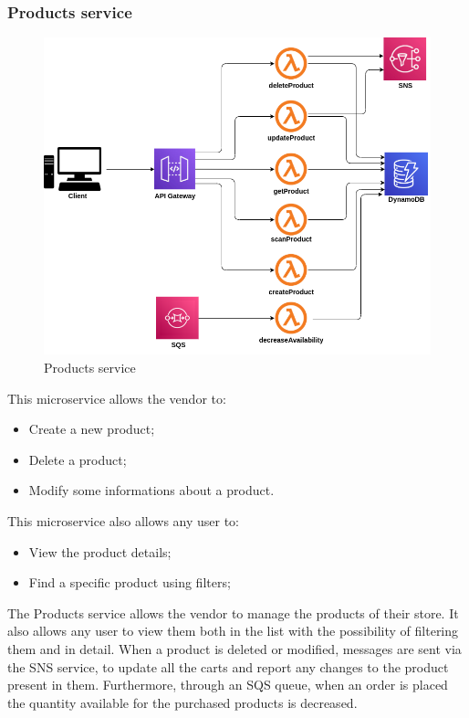 \subsubsection{Products service}
\begin{figure}[!h]
    \vspace{5px}
    \includegraphics[scale=0.5]{../../../../Images/Diagrammi/maintainerManual/productService.png}
    \centering
    \caption{Products service}
\end{figure}
This microservice allows the vendor to:
\begin{itemize}
    \item Create a new product;
    \item Delete a product;
    \item Modify some informations about a product.
\end{itemize}
This microservice also allows any user to:
\begin{itemize}
    \item View the product details;
    \item Find a specific product using filters;
\end{itemize}
The Products service allows the vendor to manage the products of their store. It also allows any user to view them both in the list with the possibility of filtering them and in detail. When a product is deleted or modified, messages are sent via the SNS service, to update all the carts and report any changes to the product present in them. Furthermore, through an SQS queue, when an order is placed the quantity available for the purchased products is decreased.
\pagebreak
